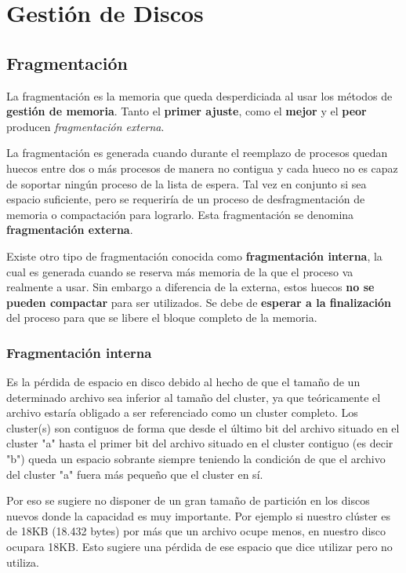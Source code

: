 \documentclass[10pt,a4paper]{article}
\begin{document}
\section{Gestión de Discos}
\subsection{Fragmentación}

La fragmentación es la memoria que queda desperdiciada al usar los métodos de \textbf{gestión de memoria}. Tanto el \textbf{primer ajuste}, como el \textbf{mejor} y el \textbf{peor} producen \textit{fragmentación externa}.

La fragmentación es generada cuando durante el reemplazo de procesos quedan huecos entre dos o más procesos de manera no contigua y cada hueco no es capaz de soportar ningún proceso de la lista de espera. Tal vez en conjunto si sea espacio suficiente, pero se requeriría de un proceso de desfragmentación de memoria o compactación para lograrlo. Esta fragmentación se denomina \textbf{fragmentación externa}.

Existe otro tipo de fragmentación conocida como \textbf{fragmentación interna}, la cual es generada cuando se reserva más memoria de la que el proceso va realmente a usar. Sin embargo a diferencia de la externa, estos huecos \textbf{no se pueden compactar} para ser utilizados. Se debe de \textbf{esperar a la finalización} del proceso para que se libere el bloque completo de la memoria.

\subsubsection{Fragmentación interna}
Es la pérdida de espacio en disco debido al hecho de que el tamaño de un determinado archivo sea inferior al tamaño del cluster, ya que teóricamente el archivo estaría obligado a ser referenciado como un cluster completo. Los cluster(s) son contiguos de forma que desde el último bit del archivo situado en el cluster "a" hasta el primer bit del archivo situado en el cluster contiguo (es decir "b") queda un espacio sobrante siempre teniendo la condición de que el archivo del cluster "a" fuera más pequeño que el cluster en sí.

Por eso se sugiere no disponer de un gran tamaño de partición en los discos nuevos donde la capacidad es muy importante. Por ejemplo si nuestro clúster es de 18KB (18.432 bytes) por más que un archivo ocupe menos, en nuestro disco ocupara 18KB. Esto sugiere una pérdida de ese espacio que dice utilizar pero no utiliza.
\end{document}
